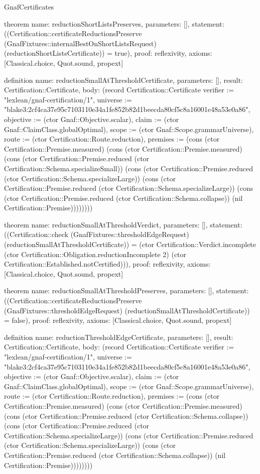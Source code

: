 \begin{lexlean}{GnafCertificates}
\begin{semanticmodule}
theorem{
  name: reductionShortListsPreserves,
  parameters: [],
  statement: ((Certification::certificateReductionsPreserve (GnafFixtures::internalBestOnShortListsRequest) (reductionShortListsCertificate)) = true),
  proof: reflexivity{},
  axioms: [Classical.choice, Quot.sound, propext]
}

definition{
  name: reductionSmallAtThresholdCertificate,
  parameters: [],
  result: Certification::Certificate,
  body: (record Certification::Certificate {verifier := "lexlean/gnaf-certification/1", universe := "blake3:2cf4ca37e95c7103110e34a1fe852b82d1beecda80cf5c8a16001e48a53e0a86", objective := (ctor Gnaf::Objective.scalar), claim := (ctor Gnaf::ClaimClass.globalOptimal), scope := (ctor Gnaf::Scope.grammarUniverse), route := (ctor Certification::Route.reduction), premises := (cons (ctor Certification::Premise.measured) (cons (ctor Certification::Premise.measured) (cons (ctor Certification::Premise.reduced (ctor Certification::Schema.specializeSmall)) (cons (ctor Certification::Premise.reduced (ctor Certification::Schema.specializeLarge)) (cons (ctor Certification::Premise.reduced (ctor Certification::Schema.specializeLarge)) (cons (ctor Certification::Premise.reduced (ctor Certification::Schema.collapse)) (nil Certification::Premise)))))))})
}

theorem{
  name: reductionSmallAtThresholdVerdict,
  parameters: [],
  statement: ((Certification::check (GnafFixtures::thresholdEdgeRequest) (reductionSmallAtThresholdCertificate)) = (ctor Certification::Verdict.incomplete (ctor Certification::Obligation.reductionIncomplete 2) (ctor Certification::Established.notCertified))),
  proof: reflexivity{},
  axioms: [Classical.choice, Quot.sound, propext]
}

theorem{
  name: reductionSmallAtThresholdPreserves,
  parameters: [],
  statement: ((Certification::certificateReductionsPreserve (GnafFixtures::thresholdEdgeRequest) (reductionSmallAtThresholdCertificate)) = false),
  proof: reflexivity{},
  axioms: [Classical.choice, Quot.sound, propext]
}

definition{
  name: reductionThresholdEdgeCertificate,
  parameters: [],
  result: Certification::Certificate,
  body: (record Certification::Certificate {verifier := "lexlean/gnaf-certification/1", universe := "blake3:2cf4ca37e95c7103110e34a1fe852b82d1beecda80cf5c8a16001e48a53e0a86", objective := (ctor Gnaf::Objective.scalar), claim := (ctor Gnaf::ClaimClass.globalOptimal), scope := (ctor Gnaf::Scope.grammarUniverse), route := (ctor Certification::Route.reduction), premises := (cons (ctor Certification::Premise.measured) (cons (ctor Certification::Premise.measured) (cons (ctor Certification::Premise.reduced (ctor Certification::Schema.collapse)) (cons (ctor Certification::Premise.reduced (ctor Certification::Schema.specializeLarge)) (cons (ctor Certification::Premise.reduced (ctor Certification::Schema.specializeLarge)) (cons (ctor Certification::Premise.reduced (ctor Certification::Schema.collapse)) (nil Certification::Premise)))))))})
}


\end{semanticmodule}
\end{lexlean}
